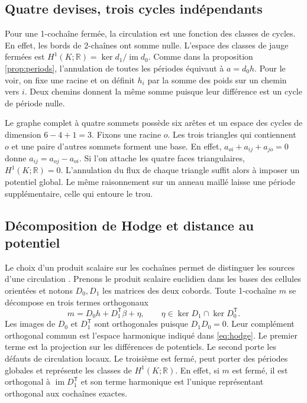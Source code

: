 \documentclass[11pt,a4paper]{article}
\theoremstyle{clair}
\newcommand{\R}{\mathbb{R}}
\begin{document}
\subsection{Quatre devises, trois cycles indépendants}

Pour une 1-cochaîne fermée, la circulation est une fonction des classes de cycles. En effet, les bords de 2-chaînes ont somme nulle. L'espace des classes de jauge fermées est \(H^1(K;\R)=\ker d_1/\operatorname{im}d_0\). Comme dans la proposition \ref{prop:periods}, l'annulation de toutes les périodes équivaut à \(a=d_0h\). Pour le voir, on fixe une racine et on définit \(h_i\) par la somme des poids sur un chemin vers \(i\). Deux chemins donnent la même somme puisque leur différence est un cycle de période nulle.

Le graphe complet à quatre sommets possède six arêtes et un espace des cycles de dimension \(6-4+1=3\). Fixons une racine \(o\). Les trois triangles qui contiennent \(o\) et une paire d'autres sommets forment une base. En effet, \(a_{oi}+a_{ij}+a_{jo}=0\) donne \(a_{ij}=a_{oj}-a_{oi}\). Si l'on attache les quatre faces triangulaires, \(H^1(K;\R)=0\). L'annulation du flux de chaque triangle suffit alors à imposer un potentiel global. Le même raisonnement sur un anneau maillé laisse une période supplémentaire, celle qui entoure le trou.

\clearpage
\subsection{Décomposition de Hodge et distance au potentiel}
\label{sec:hodge}

Le choix d'un produit scalaire sur les cochaînes permet de distinguer les sources d'une circulation \cite{hodge}. Prenons le produit scalaire euclidien dans les bases des cellules orientées et notons \(D_0,D_1\) les matrices des deux cobords. Toute 1-cochaîne \(m\) se décompose en trois termes orthogonaux
\begin{equation}
 m = D_0h + D_1^{\mathsf T}\beta + \eta,\qquad
 \eta\in\ker D_1\cap\ker D_0^{\mathsf T}.
 \label{eq:hodge}
\end{equation}
Les images de \(D_0\) et \(D_1^{\mathsf T}\) sont orthogonales puisque \(D_1D_0=0\). Leur complément orthogonal commun est l'espace harmonique indiqué dans \eqref{eq:hodge}. Le premier terme est la projection sur les différences de potentiels. Le second porte les défauts de circulation locaux. Le troisième est fermé, peut porter des périodes globales et représente les classes de \(H^1(K;\R)\). En effet, si \(m\) est fermé, il est orthogonal à \(\operatorname{im}D_1^{\mathsf T}\) et son terme harmonique est l'unique représentant orthogonal aux cochaînes exactes.
\end{document}
